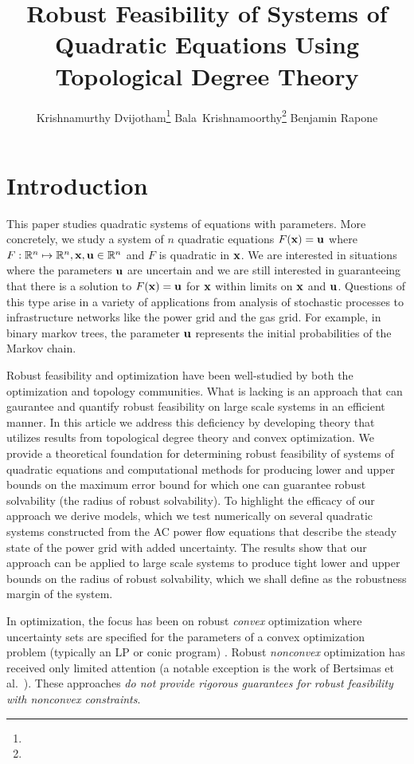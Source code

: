 \documentclass[11pt]{article}
\title{Robust Feasibility of Systems of Quadratic Equations Using Topological Degree Theory}
\author{Krishnamurthy Dvijotham\thanks{\affil{Google DeepMind}}
    \hspace*{0.3in}
  Bala~Krishnamoorthy\thanks{\affil{Washington State University}}
  \hspace*{0.3in}
  Benjamin Rapone\footnotemark[2]
}
\theoremstyle{plain}
\theoremstyle{definition}
\theoremstyle{remark}
\begin{document}
\maketitle



\section{Introduction}
  This paper studies quadratic systems of equations with parameters.
  More concretely, we study a system of $n$ quadratic equations $F(\bold x)=\bold u$ where $F: \mathbb{R}^n \mapsto \mathbb{R}^n,\bold  x,\bold u \in \mathbb{R}^n$ and $F$ is quadratic in $\bold x$.
  We are interested in situations where the parameters $\bold u$ are uncertain and we are still interested in guaranteeing that there is a solution to $F(\bold x) = \bold u$ for $\bold x$ within limits on $\bold x$ and $\bold u$.
  Questions of this type arise in a variety of applications from analysis of stochastic processes to infrastructure networks like the power grid and the gas grid.
  For example, in binary markov trees, the parameter $\bold u$ represents the initial probabilities of the Markov chain.
  
Robust feasibility and optimization have been well-studied by both the optimization and topology communities. 
What is lacking is an approach that can gaurantee and quantify robust feasibility on large scale systems in an efficient manner. 
In this article we address this deficiency by developing theory that utilizes results from topological degree theory and convex optimization. 
We provide a theoretical foundation for determining robust feasibility of systems of quadratic equations and computational methods for producing lower and upper bounds on the maximum error bound for which one can guarantee robust solvability (the radius of robust solvability). 
To highlight the efficacy of our approach we derive models, which we test numerically on several quadratic systems constructed from the AC power flow equations that describe the steady state of the power grid with added uncertainty. 
The results show that our approach can be applied to large scale systems to produce tight lower and upper bounds on the radius of robust solvability, which we shall define as the robustness margin of the system.

In optimization, the focus has been on robust \emph{convex} optimization where uncertainty sets are specified for the parameters of a convex optimization problem (typically an LP or conic program) \cite{ben2009robust}.
Robust \emph{nonconvex} optimization has received only limited attention (a notable exception is the work of Bertsimas et al.~\cite{BeNoTe2010}).
These approaches {\em do not provide rigorous guarantees for robust feasibility with nonconvex constraints}.
\end{document}
